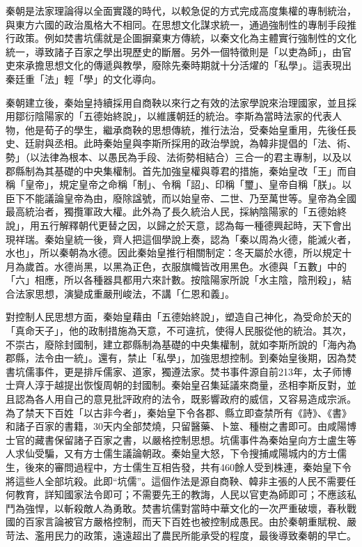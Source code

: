 秦朝是法家理論得以全面實踐的時代，以較急促的方式完成高度集權的專制統治，與東方六國的政治風格大不相同。在思想文化謀求統一，通過強制性的專制手段推行政策。例如焚書坑儒就是企圖摒棄東方傳統，以秦文化為主體實行強制性的文化統一，導致諸子百家之學出現歷史的斷層。另外一個特徵則是「以吏為師」，由官吏來承擔思想文化的傳遞與教學，廢除先秦時期就十分活燿的「私學」。這表現出秦廷重「法」輕「學」的文化導向。

秦朝建立後，秦始皇持續採用自商鞅以來行之有效的法家學說來治理國家，並且採用鄒衍陰陽家的「五德始終說」，以維護朝廷的統治。李斯為當時法家的代表人物，他是荀子的學生，繼承商鞅的思想傳統，推行法治，受秦始皇重用，先後任長史、廷尉與丞相。此時秦始皇與李斯所採用的政治學說，為韓非提倡的「法、術、勢」（以法律為根本、以愚民為手段、法術勢相結合）三合一的君主專制，以及以郡縣制為其基礎的中央集權制。首先加強皇權與尊君的措施，秦始皇改「王」而自稱「皇帝」，規定皇帝之命稱「制」、令稱「詔」、印稱「璽」、皇帝自稱「朕」。以臣下不能議論皇帝為由，廢除諡號，而以始皇帝、二世、乃至萬世等。皇帝為全國最高統治者，獨攬軍政大權。此外為了長久統治人民，採納陰陽家的「五德始終說」，用五行解釋朝代更替之因，以歸之於天意，認為每一種德興起時，天下會出現祥瑞。秦始皇統一後，齊人把這個學說上奏，認為「秦以周為火德，能滅火者，水也」，所以秦朝為水德。因此秦始皇推行相關制定：冬天屬於水德，所以規定十月為歲首。水德尚黑，以黑為正色，衣服旗幟皆改用黑色。水德與「五數」中的「六」相應，所以各種器具都用六來計數。按陰陽家所說「水主陰，陰刑殺」，結合法家思想，演變成重嚴刑峻法，不講「仁恩和義」。

對控制人民思想方面，秦始皇藉由「五德始終說」，塑造自己神化，為受命於天的「真命天子」，他的政制措施為天意，不可違抗，使得人民服從他的統治。其次，不崇古，廢除封國制，建立郡縣制為基礎的中央集權制，就如李斯所說的「海內為郡縣，法令由一統」。還有，禁止「私學」，加強思想控制。到秦始皇後期，因為焚書坑儒事件，更是排斥儒家、道家，獨遵法家。焚书事件源自前213年，太子师博士齊人淳于越提出恢愎周朝的封國制。秦始皇召集延議來商量，丞相李斯反對，並且認為各人用自己的意見批評政府的法令，既影響政府的威信，又容易造成宗派。為了禁天下百姓「以古非今者」，秦始皇下令各郡、縣立即查禁所有《詩》、《書》和諸子百家的書籍，30天内全部焚燒，只留醫藥、卜筮、種樹之書即可。由咸陽博士官的藏書保留諸子百家之書，以嚴格控制思想。坑儒事件為秦始皇向方士盧生等人求仙受騙，又有方士儒生議論朝政。秦始皇大怒，下令搜捕咸陽城内的方士儒生，後來的審問過程中，方士儒生互相告發，共有460餘人受到株連，秦始皇下令將這些人全部坑殺。此即“坑儒”。這個作法是源自商鞅、韓非主張的人民不需要任何教育，詳知國家法令即可；不需要先王的教誨，人民以官吏為師即可；不應該私鬥為強悍，以斬殺敵人為勇敢。焚書坑儒對當時中華文化的一次严重破壞，春秋戰國的百家言論被官方嚴格控制，而天下百姓也被控制成愚民。由於秦朝重賦稅、嚴苛法、濫用民力的政策，遠遠超出了農民所能承受的程度，最後導致秦朝的早亡。

